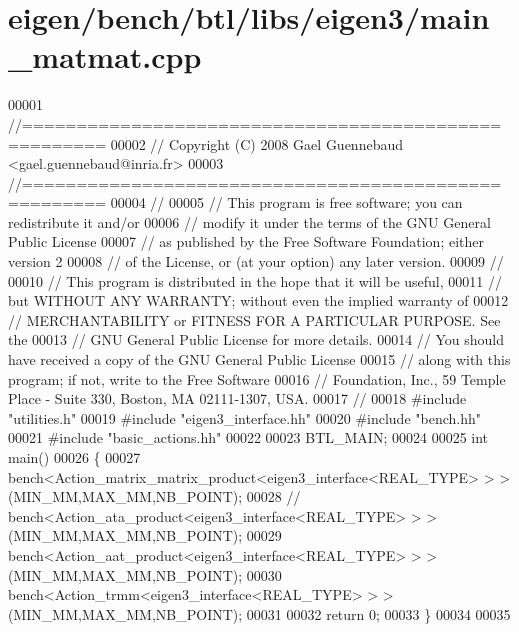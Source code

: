 \hypertarget{eigen_2bench_2btl_2libs_2eigen3_2main__matmat_8cpp_source}{}\section{eigen/bench/btl/libs/eigen3/main\+\_\+matmat.cpp}
\label{eigen_2bench_2btl_2libs_2eigen3_2main__matmat_8cpp_source}

\begin{DoxyCode}
00001 \textcolor{comment}{//=====================================================}
00002 \textcolor{comment}{// Copyright (C) 2008 Gael Guennebaud <gael.guennebaud@inria.fr>}
00003 \textcolor{comment}{//=====================================================}
00004 \textcolor{comment}{//}
00005 \textcolor{comment}{// This program is free software; you can redistribute it and/or}
00006 \textcolor{comment}{// modify it under the terms of the GNU General Public License}
00007 \textcolor{comment}{// as published by the Free Software Foundation; either version 2}
00008 \textcolor{comment}{// of the License, or (at your option) any later version.}
00009 \textcolor{comment}{//}
00010 \textcolor{comment}{// This program is distributed in the hope that it will be useful,}
00011 \textcolor{comment}{// but WITHOUT ANY WARRANTY; without even the implied warranty of}
00012 \textcolor{comment}{// MERCHANTABILITY or FITNESS FOR A PARTICULAR PURPOSE.  See the}
00013 \textcolor{comment}{// GNU General Public License for more details.}
00014 \textcolor{comment}{// You should have received a copy of the GNU General Public License}
00015 \textcolor{comment}{// along with this program; if not, write to the Free Software}
00016 \textcolor{comment}{// Foundation, Inc., 59 Temple Place - Suite 330, Boston, MA  02111-1307, USA.}
00017 \textcolor{comment}{//}
00018 \textcolor{preprocessor}{#include "utilities.h"}
00019 \textcolor{preprocessor}{#include "eigen3\_interface.hh"}
00020 \textcolor{preprocessor}{#include "bench.hh"}
00021 \textcolor{preprocessor}{#include "basic\_actions.hh"}
00022 
00023 BTL\_MAIN;
00024 
00025 \textcolor{keywordtype}{int} main()
00026 \{
00027   bench<Action\_matrix\_matrix\_product<eigen3\_interface<REAL\_TYPE> > >(MIN\_MM,MAX\_MM,NB\_POINT);
00028 \textcolor{comment}{//   bench<Action\_ata\_product<eigen3\_interface<REAL\_TYPE> > >(MIN\_MM,MAX\_MM,NB\_POINT);}
00029   bench<Action\_aat\_product<eigen3\_interface<REAL\_TYPE> > >(MIN\_MM,MAX\_MM,NB\_POINT);
00030   bench<Action\_trmm<eigen3\_interface<REAL\_TYPE> > >(MIN\_MM,MAX\_MM,NB\_POINT);
00031 
00032   \textcolor{keywordflow}{return} 0;
00033 \}
00034 
00035 
\end{DoxyCode}
